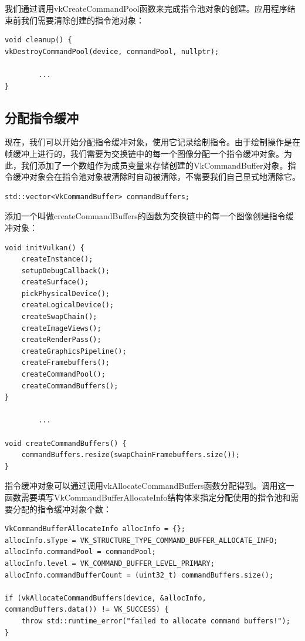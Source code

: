 \documentclass{ctexart}
\begin{document}
我们通过调用vkCreateCommandPool函数来完成指令池对象的创建。应用程序结束前我们需要清除创建的指令池对象：

\begin{lstlisting}[language={[ANSI]C}]
void cleanup() {
vkDestroyCommandPool(device, commandPool, nullptr);

		...
}
\end{lstlisting}

\subsection{分配指令缓冲}

现在，我们可以开始分配指令缓冲对象，使用它记录绘制指令。由于绘制操作是在帧缓冲上进行的，我们需要为交换链中的每一个图像分配一个指令缓冲对象。为此，我们添加了一个数组作为成员变量来存储创建的VkCommandBuffer对象。指令缓冲对象会在指令池对象被清除时自动被清除，不需要我们自己显式地清除它。

\begin{lstlisting}[language={[ANSI]C}]
std::vector<VkCommandBuffer> commandBuffers;
\end{lstlisting}

添加一个叫做createCommandBuffers的函数为交换链中的每一个图像创建指令缓冲对象：

\begin{lstlisting}[language={[ANSI]C}]
void initVulkan() {
	createInstance();
	setupDebugCallback();
	createSurface();
	pickPhysicalDevice();
	createLogicalDevice();
	createSwapChain();
	createImageViews();
	createRenderPass();
	createGraphicsPipeline();
	createFramebuffers();
	createCommandPool();
	createCommandBuffers();
}

		...

void createCommandBuffers() {
	commandBuffers.resize(swapChainFramebuffers.size());
}
\end{lstlisting}

指令缓冲对象可以通过调用vkAllocateCommandBuffers函数分配得到。调用这一函数需要填写VkCommandBufferAllocateInfo结构体来指定分配使用的指令池和需要分配的指令缓冲对象个数：

\begin{lstlisting}[language={[ANSI]C}]
VkCommandBufferAllocateInfo allocInfo = {};
allocInfo.sType = VK_STRUCTURE_TYPE_COMMAND_BUFFER_ALLOCATE_INFO;
allocInfo.commandPool = commandPool;
allocInfo.level = VK_COMMAND_BUFFER_LEVEL_PRIMARY;
allocInfo.commandBufferCount = (uint32_t) commandBuffers.size();

if (vkAllocateCommandBuffers(device, &allocInfo, commandBuffers.data()) != VK_SUCCESS) {
	throw std::runtime_error("failed to allocate command buffers!");
}
\end{lstlisting}
\end{document}
